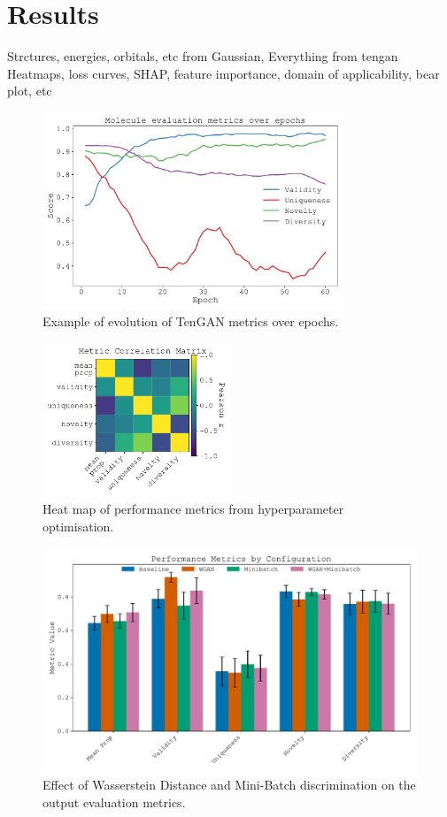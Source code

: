 \documentclass[journal=ENFL,manuscript=article]{achemso}
\begin{document}
\section{Results}
Strctures, energies, orbitals, etc from Gaussian, Everything from tengan
\\
Heatmaps, loss curves, SHAP, feature importance, domain of applicability, bear plot, etc
\begin{figure}
  \includegraphics[width=0.8\textwidth]{figures/eval_metrics_epochs.pdf}
  \caption{Example of evolution of TenGAN metrics over epochs. }
  \label{fgr:example}
\end{figure}

\begin{figure}
  \includegraphics[width=0.5\textwidth]{figures/metric_corr.pdf}
  \caption{Heat map of performance metrics from hyperparameter optimisation. }
  \label{fgr:heatMap}
\end{figure}

\begin{figure}
  \includegraphics[width=1\textwidth]{figures/grouped_bar_metrics_colorblind.pdf}
  \caption{Effect of Wasserstein Distance and Mini-Batch discrimination on the output evaluation metrics. }
  \label{fgr:example}
\end{figure}
\end{document}
